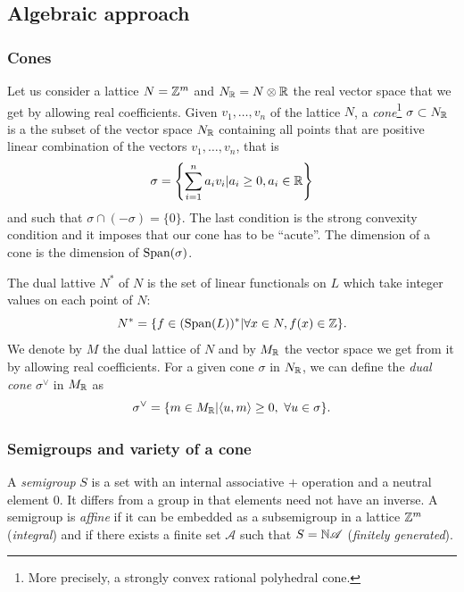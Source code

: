     \subsection{Algebraic approach}

        \subsubsection{Cones}

            Let us consider a lattice $N=\mathbb{Z}^m$ and $N_{\mathbb{R}}=N\otimes\mathbb{R}$ the real vector space that we get by allowing real coefficients. Given $v_1,\dots,v_n$ of the lattice $N$, a \emph{cone}\footnote{More precisely, a strongly convex rational polyhedral cone.} $\sigma\subset N_{\mathbb{R}}$ is a the subset of the vector space $N_{\mathbb{R}}$ containing all points that are positive linear combination of the vectors $v_1,\dots,v_n$, that is
            \begin{equation}
                \sigma=\left\{\sum^n_{i=1}a_iv_i|a_i\geq0,a_i\in\mathbb{R}\right\}
            \end{equation}
            and such that $\sigma\cap(-\sigma)=\{0\}$. The last condition is the strong convexity condition and it imposes that our cone has to be ``acute''. The dimension of a cone is the dimension of $\text{Span}(\sigma)$. 
            
            The dual lattive $N^*$ of $N$ is the set of linear functionals on $L$ which take integer values on each point of $N$:
            \begin{equation}
                N^*=\{f\in(\text{Span}(L))^*|\forall x\in N,f(x)\in\mathbb{Z}\}.
            \end{equation}
            We denote by $M$ the dual lattice of $N$ and by $M_{\mathbb{R}}$ the vector space we get from it by allowing real coefficients. For a given cone $\sigma$ in $ N_{\mathbb{R}}$, we can define the \emph{dual cone} $\sigma^\vee$ in $M_{\mathbb{R}}$ as
            \begin{equation}
                \sigma^\vee=\{m\in M_{\mathbb{R}}|\langle u,m\rangle\geq0,~ \forall u\in\sigma\}.
            \end{equation}
            
        \subsubsection{Semigroups and variety of a cone}

            A \emph{semigroup} $S$ is a set with an internal associative $+$ operation and a neutral element $0$. It differs from a group in that elements need not have an inverse. A semigroup is \emph{affine} if it can be embedded as a subsemigroup in a lattice $\mathbb{Z}^m$ (\emph{integral}) and if there exists a finite set $\mathscr{A}$ such that $S=\mathbb{N}\mathscr{A}$ (\emph{finitely generated}). 
            
